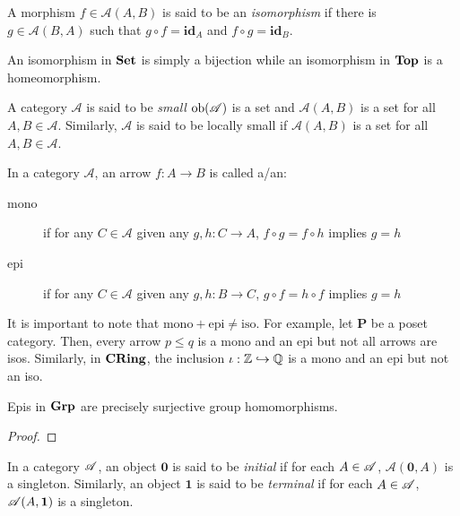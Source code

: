 \begin{definition}[Isomorphism]
    A morphism $f\in\mathscr A(A,B)$ is said to be an \textit{isomorphism} if there is $g\in\mathscr A(B,A)$ such that $g\circ f = \mathbf{id}_A$ and $f\circ g = \mathbf{id}_B$.
\end{definition}

An isomorphism in $\mathbf{Set}$ is simply a bijection while an isomorphism in $\mathbf{Top}$ is a homeomorphism.

\begin{definition}
    A category $\mathscr A$ is said to be \textit{small} $\operatorname{ob}(\mathscr A)$ is a set and $\mathscr A(A,B)$ is a set for all $A,B\in\mathscr A$. Similarly, $\mathscr A$ is said to be locally small if $\mathscr A(A,B)$ is a set for all $A,B\in\mathscr A$.
\end{definition}

\begin{definition}
    In a category $\mathscr A$, an arrow $f: A\to B$ is called a/an: 
    \begin{description}
    \item[mono] if for any $C\in\mathscr A$ given any $g,h: C\to A$, $f\circ g = f\circ h$ implies $g = h$
    \item[epi] if for any $C\in\mathscr A$ given any $g,h: B\to C$, $g\circ f = h\circ f$ implies $g = h$
    \end{description}
\end{definition}

It is important to note that $\text{mono} + \text{epi}\ne\text{iso}$. For example, let $\mathbf P$ be a poset category. Then, every arrow $p\le q$ is a mono and an epi but not all arrows are isos. Similarly, in $\mathbf{CRing}$, the inclusion $\iota:\mathbb{Z}\hookrightarrow\mathbb{Q}$ is a mono and an epi but not an iso.

\begin{proposition}
    Epis in $\mathbf{Grp}$ are precisely surjective group homomorphisms.
\end{proposition}
\begin{proof}
\end{proof}

\begin{definition}
    In a category $\mathscr{A}$, an object $\mathbf 0$ is said to be \textit{initial} if for each $A\in\mathscr{A}$, $\mathscr A(\mathbf 0,A)$ is a singleton. Similarly, an object $\mathbf 1$ is said to be \textit{terminal} if for each $A\in\mathscr{A}$, $\mathscr{A}(A,\mathbf 1)$ is a singleton.
\end{definition}

